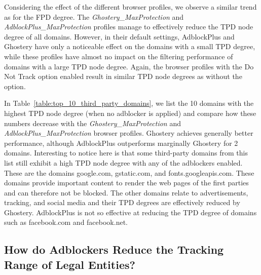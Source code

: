 \documentclass[compsoc, conference, letterpaper, 10pt, times]{IEEEtran}
\begin{document}
Considering the effect of the different browser profiles, we observe a similar trend as for the FPD degree. The \textit{Ghostery\_MaxProtection} and \textit{AdblockPlus\_MaxProtection} profiles manage to effectively reduce the TPD node degree of all domains. However, in their default settings, AdblockPlus and Ghostery have only a noticeable effect on the domains with a small TPD degree, while these profiles have almost no impact on the filtering performance of domains with a large TPD node degree. Again, the browser profiles with the Do Not Track option enabled result in similar TPD node degrees as without the option. 

In Table~\ref{table:top_10_third_party_domains}, we list the 10 domains with the highest TPD node degree (when no adblocker is applied) and compare how these numbers decrease with the \textit{Ghostery\_MaxProtection} and \textit{AdblockPlus\_MaxProtection} browser profiles. Ghostery achieves generally better performance, although AdblockPlus outperforms marginally Ghostery for 2 domains. Interesting to notice here is that some third-party domains from this list still exhibit a high TPD node degree with any of the adblockers enabled. These are the domains google.com, gstatic.com, and fonts.googleapis.com. These domains provide important content to render the web pages of the first parties and can therefore not be blocked. The other domains relate to advertisements, tracking, and social media and their TPD degrees are effectively reduced by Ghostery. AdblockPlus is not so effective at reducing the TPD degree of domains such as facebook.com and facebook.net. 



\subsection{How do Adblockers Reduce the Tracking Range of Legal Entities?}
\end{document}
